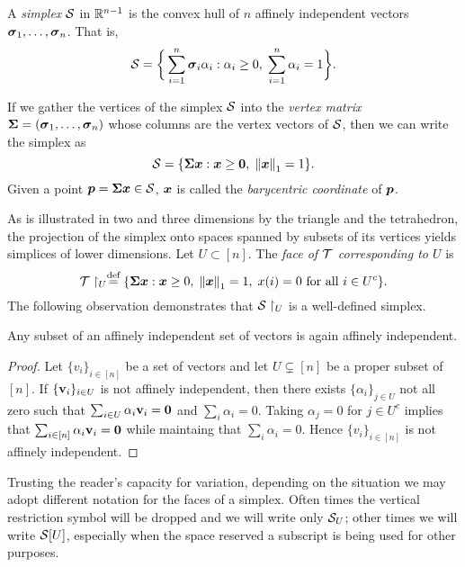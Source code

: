 \begin{definition}
A \emph{simplex} $\mathcal{S}$ in $\mathbb{R}^{n-1}$ is the convex hull of $n$ affinely independent vectors $\vb*{\sigma}_1,\dots,\vb*{\sigma}_n$. That is, 
\begin{equation*}
    \mathcal{S} = \bigg\{\sum_{i=1}^n \vb*{\sigma}_i \alpha_i: \alpha_i\geq 0,\; \sum_{i=1}^n \alpha_i=1\bigg\}. 
\end{equation*}
\end{definition}

If we gather the vertices of the simplex $\mathcal{S}$ into the \emph{vertex matrix} $\boldsymbol{\Sigma}=(\vb*{\sigma}_1,\dots,\vb*{\sigma}_n)$ whose columns are the vertex vectors of $\mathcal{S}$, then we can write the simplex as 
\begin{equation*}
    \mathcal{S} = \{\boldsymbol{\Sigma} \vb*{x}:\vb*{x}\geq \vb{0}, \; \norm{\vb*{x}}_1=1\}.
\end{equation*}
Given a point $\vb*{p}=\boldsymbol{\Sigma}\vb*{x}\in\mathcal{S}$, $\vb*{x}$ is called the \emph{barycentric coordinate} of $\vb*{p}$.  

As is illustrated in two and three dimensions by the triangle and the tetrahedron, the projection of the simplex onto spaces spanned by subsets of its vertices yields simplices of lower dimensions. Let $U\subset [n]$. The \emph{face of $\mathcal{T}$ corresponding to $U$} is 
\begin{equation}
\label{eq:T_U}
    \mathcal{T}\restriction_U \overset{\text{def}}{=} \{\boldsymbol{\Sigma}\vb*{x}: \vb*{x}\geq 0,\;\norm{\vb*{x}}_1=1,\;x(i)=0\text{ for all }i\in U^c\}.
\end{equation}
The following observation demonstrates that $\mathcal{S}\restriction_U$ is a well-defined simplex. 
\begin{observation}
	\label{obs:subset_affinely_independent}
	Any subset of an affinely independent set of vectors is again affinely independent. 
\end{observation}
\begin{proof}
	Let $\{v_i\}_{i\in[n]}$ be a set of vectors and let $U\subsetneq[n]$ be a proper subset of $[n]$. If $\{\vb{v}_i\}_{i\in U}$ is not affinely independent, then there exists $\{\alpha_i\}_{j\in U}$ not all zero such that $\sum_{i\in U}\alpha_i\vb{v}_i=\vb{0}$ and $\sum_i\alpha_i=0$. Taking $\alpha_j=0$ for $j\in U^c$ implies that $\sum_{i\in[n]}\alpha_i\vb{v}_i=\vb{0}$ while maintaing that $\sum_{i}\alpha_i=0$. Hence $\{v_i\}_{i\in[n]}$ is not affinely independent. 
\end{proof}

Trusting the reader's capacity for variation, depending on the situation we may adopt different notation for the faces of a simplex. Often times the vertical restriction symbol will be dropped and we will write only $\mathcal{S}_U$; other times we will write $\mathcal{S}[U]$, especially when the space reserved a subscript is being used for other purposes. 

